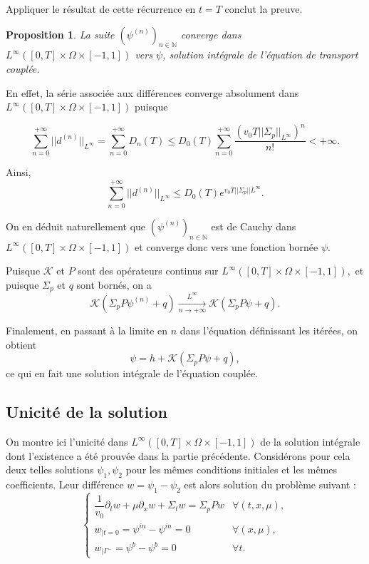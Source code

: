 \documentclass{article}
\newtheorem{proposition}[theorem]{Proposition}
\begin{document}
Appliquer le résultat de cette récurrence en $t=T$ conclut la preuve.

\begin{proposition}
    La suite \(\left(\psi^{(n)}\right)_{n\in\mathbb N}\) converge dans \(L^\infty([0,T]\times\Omega\times[-1,1])\) vers $\psi$, solution intégrale de l’équation de transport couplée.
\end{proposition}
En effet, la série associée aux différences converge absolument dans \(L^\infty([0,T]\times\Omega\times[-1,1])\) puisque

\[
\sum_{n=0}^{+\infty} ||d^{(n)}||_{L^\infty}
=\sum_{n=0}^{+\infty}D_n(T)
\leq D_0(T)\sum_{n=0}^{+\infty}\frac{
\left( v_0T||\Sigma_p||_{L^\infty} \right)^n}{n!}
<+\infty.
\]

Ainsi,
\[
\sum_{n=0}^{+\infty}||d^{(n)}||_{L^\infty}
\leq D_0(T) e^{v_0T||\Sigma_p||{L^\infty}}.
\]

On en déduit naturellement que \(\left(\psi^{(n)}\right)_{n\in\mathbb N}\) est de Cauchy dans \(L^\infty([0,T]\times\Omega\times[-1,1])\) et converge donc vers une fonction bornée $\psi$.

Puisque $\mathcal K$ et $P$ sont des opérateurs continus sur \(L^\infty([0,T]\times\Omega\times[-1,1]),\) et puisque $\Sigma_p$ et $q$ sont bornés, on a
\[
\mathcal K(\Sigma_pP\psi^{(n)}+q) \xrightarrow[n\to+\infty]{L^\infty}\mathcal{K}(\Sigma_pP\psi+q).
\]

Finalement, en passant à la limite en $n$ dans l’équation définissant les itérées, on obtient
\begin{equation}
    \psi =h+\mathcal K(\Sigma_pP\psi+q),
\end{equation}
ce qui en fait une solution intégrale de l’équation couplée.

\subsection{Unicité de la solution}

On montre ici l’unicité dans \(L^\infty([0,T]\times\Omega\times[-1,1])\) de la solution intégrale dont l’existence a été prouvée dans la partie précédente. Considérons pour cela deux telles solutions $\psi_1,\psi_2$ pour les mêmes conditions initiales et les mêmes coefficients. Leur différence \(w=\psi_1-\psi_2\) est alors solution du problème suivant :
\[
\begin{cases}
    \dfrac1{v_0}\partial_t w + \mu\partial_x w + \Sigma_t w =\Sigma_pPw
    & \forall(t,x,\mu), \\
    w_{|t=0} = \psi^{in}-\psi^{in} = 0 & \forall(x,\mu), \\
    w_{|\Gamma^-} = \psi^b-\psi^b = 0  & \forall t.
\end{cases}
\]
\end{document}
